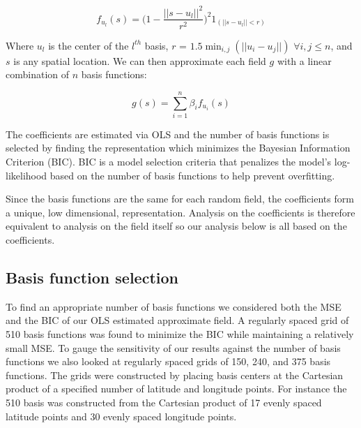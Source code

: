 \documentclass[12pt]{article}
\begin{document}
$$ f_{u_l}(s) = \bigg(1 -  \frac{||s - u_l||^2}{r^2}\bigg)^2  1_{(||s - u_l|| < r)} $$

Where $u_l$ is the center of the $l^{th}$ basis, $r$ = $1.5\min_{i, j}(||u_i - u_j||)$  $ \forall	i, j \leq n$, and $s$ is any spatial location.  We can then approximate each field $g$ with a linear combination of $n$ basis functions:

$$ g(s)  = \sum_{i=1}^{n} \beta_i f_{u_i}(s)$$

The coefficients are estimated via OLS and the number of basis functions is selected by finding the representation which minimizes the Bayesian Information Criterion (BIC). BIC is a model selection criteria that penalizes the model's log-likelihood based on the number of basis functions to help prevent overfitting. 

Since the basis functions are the same for each random field, the coefficients form a unique, low dimensional, representation. Analysis on the coefficients is therefore equivalent to analysis on the field itself so our analysis below is all based on the coefficients. 

\subsection{Basis function selection}
To find an appropriate number of basis functions we considered both the MSE and the BIC\cite{Schwarz78} of our OLS estimated approximate field. A regularly spaced grid of 510 basis functions was found to minimize the BIC while maintaining a relatively small MSE. To gauge the sensitivity of our results against the number of basis functions we also looked at regularly spaced grids of 150, 240, and 375 basis functions. The grids were constructed by placing basis centers at the Cartesian product of a specified number of latitude and longitude points. For instance the 510 basis was constructed from the Cartesian product of 17 evenly spaced latitude points and 30 evenly spaced longitude points. 
\end{document}
